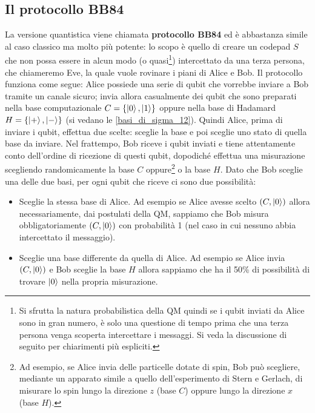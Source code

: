 \subsection{Il protocollo BB84}
La versione quantistica viene chiamata \textbf{protocollo BB84} ed è abbastanza simile al caso classico ma molto più potente: lo scopo è quello di creare un codepad $S$ che non possa essere in alcun modo (o quasi\footnote{Si sfrutta la natura probabilistica della QM quindi se  i qubit inviati da Alice sono in gran numero, è solo una questione di tempo prima che una terza persona venga scoperta intercettare i messaggi. Si veda la discussione di seguito per chiarimenti più espliciti.}) intercettato da una terza persona, che chiameremo Eve, la quale vuole rovinare i piani di Alice e Bob. Il protocollo funziona come segue: Alice possiede una serie di qubit che vorrebbe inviare a Bob tramite un canale sicuro; invia allora casualmente dei qubit che sono preparati nella base computazionale $C = \{ \ket{0}, \ket{1} \}$ oppure nella base di Hadamard $H = \{ \ket{+}, \ket{-} \}$ (si vedano le \eqref{basi_di_sigma_12}). Quindi Alice, prima di inviare i qubit, effettua due scelte: sceglie la base e poi sceglie uno stato di quella base da inviare. Nel frattempo, Bob riceve i qubit inviati e tiene attentamente conto dell'ordine di ricezione di questi qubit, dopodiché effettua una misurazione scegliendo randomicamente la base $C$ oppure\footnote{Ad esempio, se Alice invia delle particelle dotate di spin, Bob può scegliere, mediante un apparato simile a quello dell'esperimento di Stern e Gerlach, di misurare lo spin lungo la direzione $z$ (base $C$) oppure lungo la direzione $x$ (base $H$).} o la base $H$. Dato che Bob sceglie una delle due basi, per ogni qubit che riceve ci sono due possibilità:
\begin{itemize}
    \item Sceglie la stessa base di Alice. Ad esempio se Alice avesse scelto $(C, \ket{0})$ allora necessariamente, dai postulati della QM, sappiamo che Bob misura obbligatoriamente $(C, \ket{0})$ con probabilità 1 (nel caso in cui nessuno abbia intercettato il messaggio).
    
    \item Sceglie una base differente da quella di Alice. Ad esempio se Alice invia $(C, \ket{0})$ e Bob sceglie la base $H$ allora sappiamo che ha il 50\% di possibilità di trovare $\ket{0}$ nella propria misurazione. 
\end{itemize}

